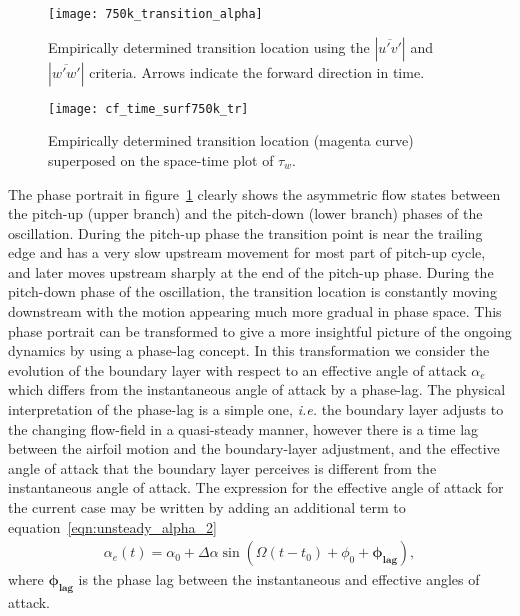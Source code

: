 \begin{figure}[h]
	\centering	
	\texttt{[image: 750k\_transition\_alpha]}
	\caption{Empirically determined transition location using the $|\overline{u'v'}|$ and $|\overline{w'w'}|$ criteria. Arrows indicate the forward direction in time.}
	\label{fig:750k_tr_alpha}
\end{figure}
\begin{figure}
	\texttt{[image: cf\_time\_surf750k\_tr]}
	\caption{Empirically determined transition location (magenta curve) superposed on the space-time plot of $\tau_{w}$.}
	\label{fig:750k_space-time_tr}
\end{figure}

The phase portrait in figure~\ref{fig:750k_tr_alpha} clearly shows the asymmetric flow states between the pitch-up (upper branch) and the pitch-down (lower branch) phases of the oscillation. During the pitch-up phase the transition point is near the trailing edge and has a very slow upstream movement for most part of pitch-up cycle, and later moves upstream sharply at the end of the pitch-up phase. During the pitch-down phase of the oscillation, the transition location is constantly moving downstream with the motion appearing much more gradual in phase space. This phase portrait can be transformed to give a more insightful picture of the ongoing dynamics by using a phase-lag concept. In this transformation we consider the evolution of the boundary layer with respect to an effective angle of attack $\alpha_{e}$ which differs from the instantaneous angle of attack by a phase-lag. The physical interpretation of the phase-lag is a simple one, \textit{i.e.} the boundary layer adjusts to the changing flow-field in a quasi-steady manner, however there is a time lag between the airfoil motion and the boundary-layer adjustment, and the effective angle of attack that the boundary layer perceives is different from the instantaneous angle of attack. The expression for the effective angle of attack for the current case may be written by adding an additional term to equation~\ref{eqn:unsteady_alpha_2}
\begin{align}
	\alpha_{e}(t) = \alpha_{0} + \Delta\alpha\sin(\Omega (t-t_{0}) + \phi_{0} + \boldsymbol{\phi_{lag}}),
	\label{eqn:unsteady_alpha_3}
\end{align}
where $\boldsymbol{\phi_{lag}}$ is the phase lag between the instantaneous and effective angles of attack.

